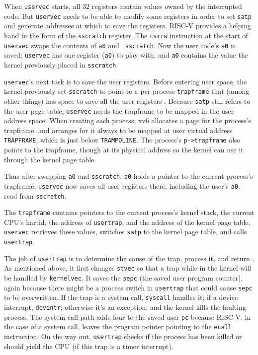 When {\tt uservec} starts, all 32 registers contain values owned by
the interrupted code. But {\tt uservec} needs to be able to modify
some registers in order to set {\tt satp} and generate addresses at
which to save the registers. RISC-V provides a helping hand in the
form of the {\tt sscratch} register. The {\tt csrrw} instruction at
the start of {\tt uservec} swaps the contents of {\tt a0} and {\tt
  sscratch}. Now the user code's {\tt a0} is saved; {\tt uservec} has
one register ({\tt a0}) to play with; and {\tt a0} contains the
value the kernel previously placed in {\tt sscratch}.

{\tt uservec}'s next task is to save the user registers. Before
entering user space, the kernel previously set {\tt sscratch} to point to a
per-process {\tt trapframe} that (among other things) has space to
save all the user registers
. Because {\tt satp} still
refers to the user page table, {\tt uservec} needs the trapframe to be
mapped in the user address space. When creating each process, xv6
allocates a page for the process's trapframe, and arranges for it
always to be mapped at user virtual address {\tt TRAPFRAME}, which is
just below {\tt TRAMPOLINE}. The process's {\tt p->trapframe} also
points to the
trapframe, though at its physical address so the kernel can use it
through the kernel page table.

Thus after swapping {\tt a0} and {\tt sscratch}, {\tt a0}
holds a pointer to the current process's trapframe.
{\tt uservec} now saves all user registers there,
including the user's {\tt a0}, read from {\tt sscratch}.

The {\tt trapframe} contains pointers to the current process's
kernel stack, the current CPU's hartid, the address of {\tt usertrap},
and the address of the kernel page table. {\tt uservec}
retrieves these values, switches {\tt satp} to the kernel page table,
and calls {\tt usertrap}.

The job of {\tt usertrap} is to determine
the cause of the trap, process it, and return
.
As mentioned above, it first changes {\tt stvec} so
that a trap while in the kernel will be handled by
{\tt kernelvec}.
It saves the {\tt sepc} (the saved user program counter),
again because there might be a
process switch in {\tt usertrap} that could cause {\tt sepc}
to be overwritten.
If the trap is a system call, {\tt syscall} handles it;
if a device interrupt, {\tt devintr};
otherwise it's an exception, and the kernel kills the
faulting process.
The system call path adds four to the saved user {\tt pc}
because RISC-V, in the case of a system call,
leaves the program pointer pointing to the {\tt ecall} instruction.
On the way out, {\tt usertrap} checks if the process has been
killed or should yield the CPU (if this trap is a timer interrupt).

